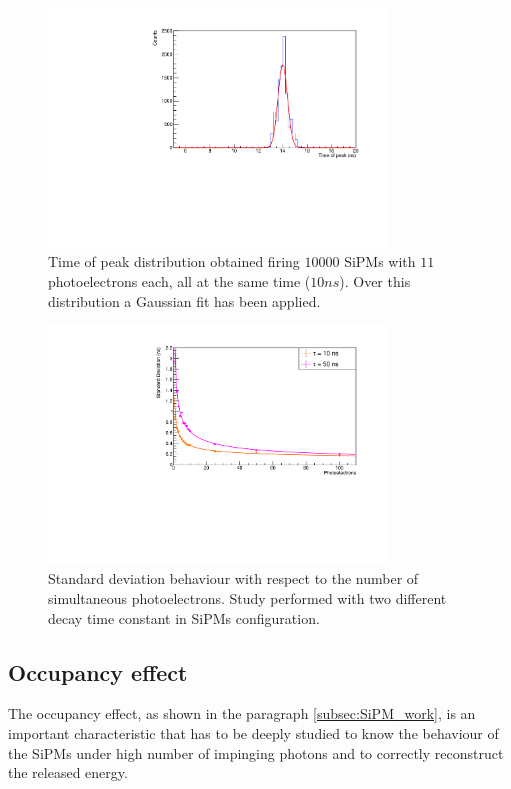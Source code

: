 \begin{figure}
	\centering
	\includegraphics[width=0.8\textwidth]{IMG/Cap5/Dummy11pe_50ns}
	\caption{Time of peak distribution obtained firing $10000$ SiPMs with $11$ photoelectrons each, all at the same time ($10 ns$). Over this distribution a Gaussian fit has been applied.}
	\label{fig:top_dummy}
\end{figure}

\begin{figure}
	\centering
	\includegraphics[width=0.8\textwidth]{IMG/Cap5/PeakSpread}
	\caption{Standard deviation behaviour with respect to the number of simultaneous photoelectrons. Study performed with two different decay time constant in SiPMs configuration.}
	\label{fig:top_sigma}
\end{figure}


\subsection{Occupancy effect} \label{subsec:Sat_effect}
The occupancy effect, as shown in the paragraph \ref{subsec:SiPM_work}, is an important characteristic that has to be deeply studied to know the behaviour of the SiPMs under high number of impinging photons and to correctly reconstruct the released energy.\\

